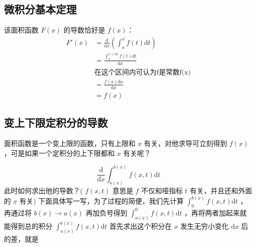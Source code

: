 \documentclass[lang=cn,newtx,10pt,scheme=chinese]{elegantbook}
\begin{document}
\subsection{微积分基本定理}
该面积函数 $F(x)$ 的导数恰好是 $f(x)$：
\begin{equation}
    \begin{aligned}
    F'(x) &= \frac{\mathrm{d}}{\mathrm{d}x} \left( \int_{a}^{x} f(t) \mathrm{d}t \right)  \\
    &= \frac{\int_{x}^{x+\mathrm{d}x} f(t) \mathrm{d}t }{\mathrm{d}x}  \\
    &\text{在这个区间内可认为f是常数f(x)}\\
    &= \frac{f(x) \mathrm{d}x}{\mathrm{d}x} \\
    &= f(x)
    \end{aligned}
\end{equation}

\subsection{变上下限定积分的导数}
面积函数是一个变上限的函数，只有上限和 $x$ 有关，对他求导可立刻得到 $f(x)$ ，可是如果一个定积分的上下限都和 $x$ 有关呢？

\begin{equation}
  \frac{\mathrm{d} }{\mathrm{d}x} \int_{a(x)}^{b(x)} f(x,t) \mathrm{d}t
\end{equation}
此时如何求出他的导数？( $f(x,t)$ 意思是 $f$ 不仅和哑指标 $t$ 有关，并且还和外面的 $x$ 有关) 
下面具体写一写，为了过程的简便，我们先计算 $\int_{0}^{b(x)} f(x,t) \mathrm{d}t $ ，再通过将 $b(x)\to a(x)$ 再加负号得到 $\int_{a(x)}^{0} f(x,t) \mathrm{d}t$ ，再将两者加起来就能得到总的积分 $\int_{a(x)}^{b(x)} f(x,t) \mathrm{d}t$
首先求出这个积分在 $x$ 发生无穷小变化 $\mathrm{d}x$ 后的差，就是
\end{document}
